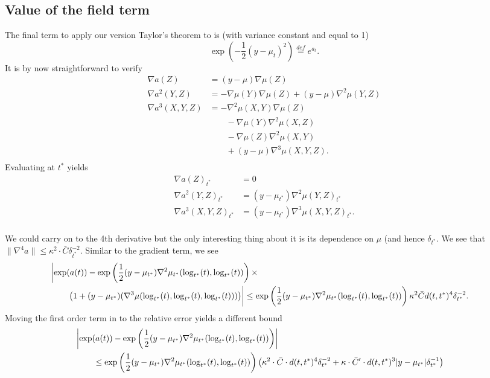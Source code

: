 \documentclass{article}
\begin{document}
\subsection{Value of the field term}

The final term to apply our version Taylor's theorem to is (with variance constant and equal to 1)
$$
\exp\left(-\frac{1}{2}(y-\mu_t)^2\right) \overset{def}{=} e^{a_t}.
$$
It is by now straightforward to verify
$$
\begin{aligned}
\nabla a(Z) &= (y-\mu) \nabla \mu(Z)\\
\nabla a^2(Y, Z) &= -\nabla \mu(Y) \nabla \mu(Z) + (y-\mu) \nabla^2 \mu(Y, Z)\\
\nabla a^3(X, Y, Z) &= -\nabla^2 \mu(X, Y) \nabla \mu(Z)\\
& \qquad -\nabla \mu(Y) \nabla^2 \mu(X, Z) \\
& \qquad -\nabla \mu(Z) \nabla^2 \mu(X, Y) \\
& \qquad + (y - \mu) \nabla^3 \mu(X, Y, Z). \\
\end{aligned}
$$
Evaluating at $t^*$ yields
$$
\begin{aligned}
\nabla a(Z)_{t^*} &= 0 \\
\nabla a^2(Y, Z)_{t^*} &=  (y-\mu_{t^*}) \nabla^2 \mu(Y, Z)_{t^*}\\
\nabla a^3(X, Y, Z)_{t^*} &=   (y - \mu_{t^*}) \nabla^3 \mu(X, Y, Z)_{t^*}. \\
\end{aligned}
$$

We could carry on to the 4th derivative but the only interesting thing about it is its dependence on $\mu$ (and hence $\delta_{t^*}$. We see that $\|\nabla^4 a\| \leq \kappa^2 \cdot \bar{C} \delta_{t^*}^{-2}$.
Similar to the gradient term, we see
$$
\begin{aligned}
  \lefteqn{\biggl|\exp(a(t)) - \exp\left(\frac{1}{2}(y-\mu_{t^*}) \nabla^2 \mu_{t^*}(\log_{t^*}(t), \log_{t^*}(t))\right) \times} \\
  & \qquad \left(1 + (y - \mu_{t^*})( \nabla^3 \mu(\log_{t^*}(t), \log_{t^*}(t) ,\log_{t^*}(t))) \right)\biggr|
  \leq \exp\left(\frac{1}{2}(y-\mu_{t^*}) \nabla^2 \mu_{t^*}(\log_{t^*}(t), \log_{t^*}(t))\right) \kappa^2 \bar{C} d(t,t^*)^4 \delta_{t^*}^{-2}.
\end{aligned}
$$
Moving the first order term in to the relative error yields a different bound
$$
\begin{aligned}
  \lefteqn{\biggl|\exp(a(t)) - \exp\left(\frac{1}{2}(y-\mu_{t^*}) \nabla^2 \mu_{t^*}(\log_{t^*}(t), \log_{t^*}(t))\right)\biggr|} \\
  & \qquad 
  \leq \exp\left(\frac{1}{2}(y-\mu_{t^*}) \nabla^2 \mu_{t^*}(\log_{t^*}(t), \log_{t^*}(t))\right) \left(\kappa^2 \cdot \bar{C} \cdot d(t,t^*)^4 \delta_{t^*}^{-2} +  \kappa \cdot \bar{C}' \cdot d(t,t^*)^3 |y - \mu_{t^*}| \delta_{t^*}^{-1} \right)
\end{aligned}
$$
\end{document}
